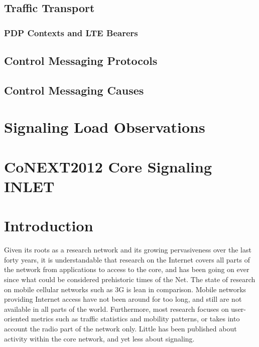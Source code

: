 \subsection{Traffic Transport}
\subsubsection{PDP Contexts and LTE Bearers}
\subsection{Control Messaging Protocols}
\subsection{Control Messaging Causes}



\section{Signaling Load Observations}



\section{CoNEXT2012 Core Signaling INLET}


\section{Introduction}
\label{sec:introduction-CONEXT}

Given its roots as a research network and its growing pervasiveness over the last forty years, it is understandable that research on the Internet covers all parts of the network from applications to access to the core, and has been going on ever since what could be considered prehistoric times of the Net. The state of research on mobile cellular networks such as 3G is lean in comparison. Mobile networks providing Internet access have not been around for too long, and still are not available in all parts of the world. Furthermore, most research focuses on user-oriented metrics such as traffic statistics and mobility patterns, or takes into account the radio part of the network only. Little has been published about activity within the core network, and yet less about signaling.

